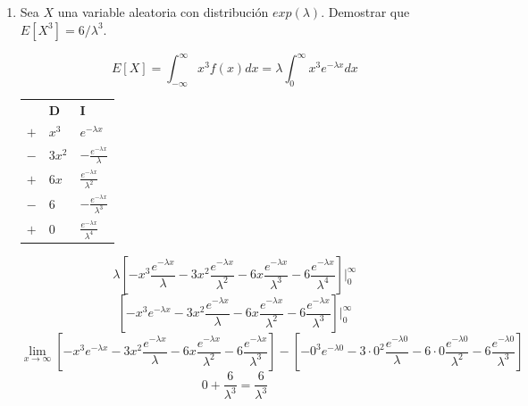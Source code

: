 \documentclass[a4paper, 12pt]{article}
\newcommand{\Pspace}{0.5cm}
\newcommand{\Aspace}{0.2cm}
\begin{document}
\begin{enumerate}
        \vspace{\Pspace}
    \item Sea $X$ una variable aleatoria con distribución $exp(\lambda)$. Demostrar que $E[X^{3}] = 6  / \lambda^{3}$.
            \vspace{\Aspace}
            { \color{azul} 
                \[
                    E[X] 
                    = \int_{-\infty}^{\infty} x^{3}f(x)dx
                    = \lambda \int_{0}^{\infty} x^{3}e^{-\lambda x}dx
                \]
                \begin{center}
                    \begin{tabular}{lll}
                                &   \textbf{D}  &   \textbf{I}                              \\
                        $+$     &   $x^{3}$     &   $e^{-\lambda x}$                        \\
                        $-$     &   $3x^{2}$    &   $-\frac{e^{-\lambda x}}{\lambda}$       \\
                        $+$     &   $6x$        &   $\frac{e^{-\lambda x}}{\lambda^{2}}$    \\
                        $-$     &   $6$         &   $-\frac{e^{-\lambda x}}{\lambda^{3}}$   \\
                        $+$     &   $0$         &   $\frac{e^{-\lambda x}}{\lambda^{4}}$
                    \end{tabular}
                \end{center}
                \[
                    \lambda\left[
                        - x^{3}\frac{e^{-\lambda x}}{\lambda} 
                        - 3x^{2}\frac{e^{-\lambda x}}{\lambda^{2}}
                        - 6x\frac{e^{-\lambda x}}{\lambda^{3}}
                        - 6\frac{e^{-\lambda x}}{\lambda^{4}}
                    \right] \Big|_{0}^{\infty}
                \]
                \[
                    \left[
                        - x^{3}e^{-\lambda x} 
                        - 3x^{2}\frac{e^{-\lambda x}}{\lambda}
                        - 6x\frac{e^{-\lambda x}}{\lambda^{2}}
                        - 6\frac{e^{-\lambda x}}{\lambda^{3}}
                    \right] \Big|_{0}^{\infty}
                \]
                \[
                    \lim_{x \to \infty} \left[
                        - x^{3}e^{-\lambda x} 
                        - 3x^{2}\frac{e^{-\lambda x}}{\lambda}
                        - 6x\frac{e^{-\lambda x}}{\lambda^{2}}
                        - 6\frac{e^{-\lambda x}}{\lambda^{3}}
                    \right]
                    - \left[
                        - 0^{3}e^{-\lambda 0} 
                        - 3 \cdot 0^{2}\frac{e^{-\lambda 0}}{\lambda}
                        - 6 \cdot 0\frac{e^{-\lambda 0}}{\lambda^{2}}
                        - 6\frac{e^{-\lambda 0}}{\lambda^{3}}
                    \right]
                \]
                \[
                    0 + \frac{6}{\lambda^{3}} = \frac{6}{\lambda^{3}}
                \]
            }


\end{enumerate}
\end{document}
